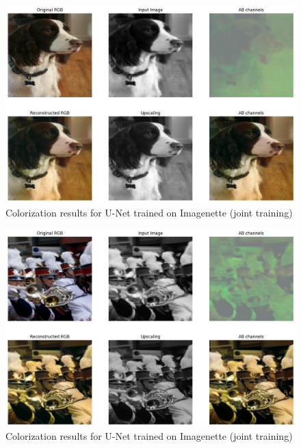 \documentclass[aspectratio=169]{beamer}
\theoremstyle{definition}
\begin{document}
\begin{frame}
    \begin{figure}
        \centering
        \includegraphics[width=.75\textwidth]{demo-both/dog.png}
        \caption{Colorization results for U-Net trained on Imagenette (joint training)}
    \end{figure}
\end{frame}

\begin{frame}
    \begin{figure}
        \centering
        \includegraphics[width=.75\textwidth]{demo-both/upscaling-artefacts.png}
        \caption{Colorization results for U-Net trained on Imagenette (joint training)}
    \end{figure}
\end{frame}
\end{document}
